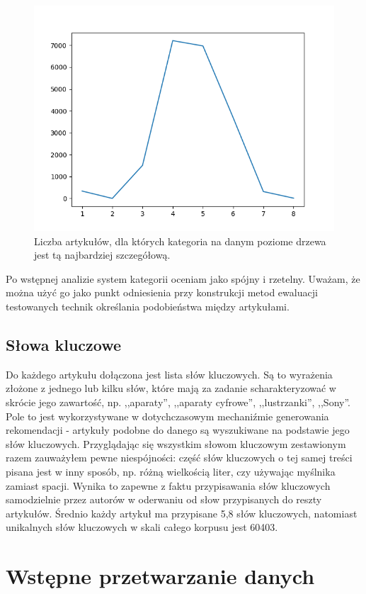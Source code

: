 \documentclass[pl]{minipw} %
\begin{document}
\begin{figure}[H]
	\centering
	\includegraphics[width=1\textwidth]{img/cat_art_levels.png}
	\caption{Liczba artykułów, dla których kategoria na danym poziome drzewa jest tą najbardziej szczegółową.}
\end{figure}
Po wstępnej analizie system kategorii oceniam jako spójny i rzetelny. Uważam, że można użyć go jako punkt odniesienia przy konstrukcji metod ewaluacji testowanych technik określania podobieństwa między artykułami.
\subsection{Słowa kluczowe}
Do każdego artykułu dołączona jest lista słów kluczowych. Są to wyrażenia złożone z jednego lub kilku słów, które mają za zadanie scharakteryzować w skrócie jego zawartość, np. ,,aparaty'', ,,aparaty cyfrowe'', ,,lustrzanki'', ,,Sony''. Pole to jest wykorzystywane w dotychczasowym mechaniźmie generowania rekomendacji - artykuły podobne do danego są wyszukiwane na podstawie jego słów kluczowych. Przyglądając się wszystkim słowom kluczowym zestawionym razem zauważyłem pewne niespójności: część słów kluczowych o tej samej treści pisana jest w inny sposób, np. różną wielkością liter, czy używając myślnika zamiast spacji. Wynika to zapewne z faktu przypisawania słów kluczowych samodzielnie przez autorów w oderwaniu od słow przypisanych do reszty artykułów. Średnio każdy artykuł ma przypisane 5,8 słów kluczowych, natomiast unikalnych słów kluczowych w skali całego korpusu jest 60403.

\section{Wstępne przetwarzanie danych}
\end{document}
